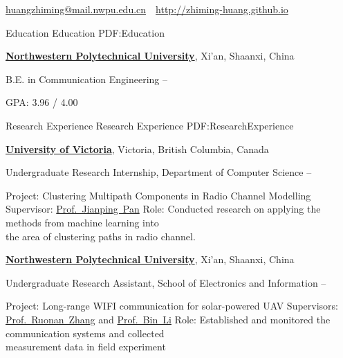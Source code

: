 \documentclass[letterpaper,MMMyyyy,nonstopmode]{simpleresumecv}
\newcommand{\CVAuthor}{Zhiming Huang}
\newcommand{\CVWebpage}{http://zhiming-huang.github.io}
\begin{document}

\Title{\CVAuthor}

\begin{SubTitle}
\href{mailto:huangzhiming@mail.nwpu.edu.cn}
{huangzhiming@mail.nwpu.edu.cn}
\,\SubBulletSymbol\,
\href{\CVWebpage}
{\url{\CVWebpage}}
\end{SubTitle}

\begin{Body}


\Section
{Education}
{Education}
{PDF:Education}

\Entry
\href{http://en.nwpu.edu.cn/EnglishNew/AboutNPU/overviewnew.htm}
{\textbf{Northwestern Polytechnical University}},
Xi'an, Shaanxi, China

\Gap
\BulletItem
B.E. in
{Communication Engineering}
\hfill
{} --
\begin{Detail}
\SubBulletItem
GPA: 3.96 / 4.00
\end{Detail}


\Section
{Research Experience}
{Research Experience}
{PDF:ResearchExperience}

\Entry
\href{http://www.uvic.ca/}
{\textbf{University of Victoria}},
Victoria, British Columbia, Canada

\Gap
\BulletItem
Undergraduate Research Internship, Department of Computer Science
\hfill
{} --
\begin{Detail}
\SubBulletItem
Project:
Clustering Multipath Components in Radio Channel Modelling
\SubBulletItem
Supervisor:
\href{http://webhome.cs.uvic.ca/~pan/}
{Prof.~Jianping~Pan}
\SubBulletItem
Role:
Conducted research on applying the methods from machine learning into \\the area of clustering paths in radio channel.
\end{Detail}

\Entry
\href{http://en.nwpu.edu.cn/}
{\textbf{Northwestern Polytechnical University}},
Xi'an, Shaanxi, China

\Gap
\BulletItem
Undergraduate Research Assistant, School of Electronics and Information
\hfill
{} --
\begin{Detail}
\SubBulletItem
Project:
Long-range WIFI communication for solar-powered UAV
\SubBulletItem
Supervisors:
\href{http://teacher.nwpu.edu.cn/rzhang}
{Prof.~Ruonan~Zhang} and
\href{http://teacher.nwpu.edu.cn/2014010059.html}
{Prof.~Bin~Li}
\SubBulletItem
Role: Established and monitored the communication systems and collected \\ measurement data in field experiment


\end{Detail}
\end{Body}
\end{document}
